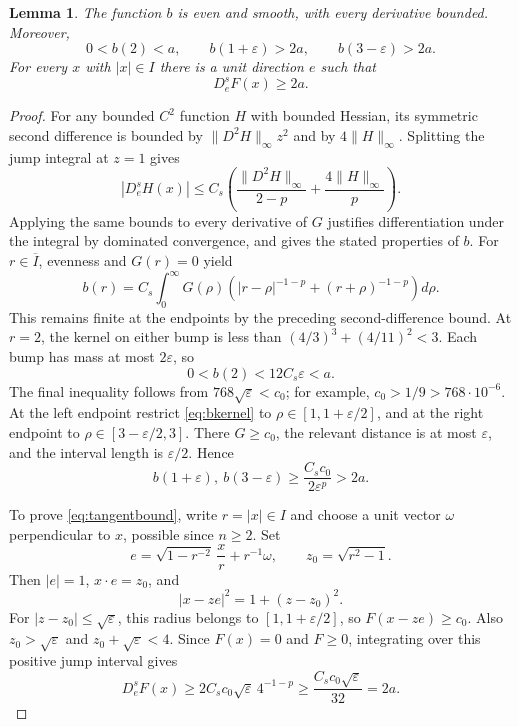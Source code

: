 \documentclass[11pt]{article}
\newtheorem{lemma}{Lemma}
\newcommand{\norm}[1]{\lVert#1\rVert_\infty}
\begin{document}
\begin{lemma}\label{lem:annuli}
The function $b$ is even and smooth, with every derivative bounded. Moreover,
\begin{equation}\label{eq:radialbounds}
 0<b(2)<a,\qquad b(1+\varepsilon)>2a,\qquad b(3-\varepsilon)>2a.
\end{equation}
For every $x$ with $|x|\in I$ there is a unit direction $e$ such that
\begin{equation}\label{eq:tangentbound}
 D_e^sF(x)\ge2a.
\end{equation}
\end{lemma}
\begin{proof}
For any bounded $C^2$ function $H$ with bounded Hessian, its symmetric
second difference is bounded by $\norm{D^2H}z^2$ and by $4\norm H$.
Splitting the jump integral at $z=1$ gives
\begin{equation}\label{eq:universalbound}
 |D_e^sH(x)|\le C_s\left(\frac{\norm{D^2H}}{2-p}
                         +\frac{4\norm H}{p}\right).
\end{equation}
Applying the same bounds to every derivative of $G$ justifies differentiation
under the integral by dominated convergence, and gives the stated properties
of $b$. For $r\in\overline I$, evenness and $G(r)=0$ yield
\begin{equation}\label{eq:bkernel}
 b(r)=C_s\int_0^\infty G(\rho)
 \left(|r-\rho|^{-1-p}+(r+\rho)^{-1-p}\right)d\rho.
\end{equation}
This remains finite at the endpoints by the preceding second-difference
bound. At $r=2$, the kernel on either bump is less than
$(4/3)^3+(4/11)^2<3$. Each bump has mass at most $2\varepsilon$, so
\[
 0<b(2)<12C_s\varepsilon<a.
\]
The final inequality follows from $768\sqrt\varepsilon<c_0$; for example,
$c_0>1/9>768\cdot10^{-6}$.
At the left endpoint restrict \eqref{eq:bkernel} to
$\rho\in[1,1+\varepsilon/2]$, and at the right endpoint to
$\rho\in[3-\varepsilon/2,3]$. There $G\ge c_0$, the relevant distance is
at most $\varepsilon$, and the interval length is $\varepsilon/2$. Hence
\[
 b(1+\varepsilon),\ b(3-\varepsilon)
 \ge \frac{C_s c_0}{2\varepsilon^p}>2a.
\]

To prove \eqref{eq:tangentbound}, write $r=|x|\in I$ and choose a unit
vector $\omega$ perpendicular to $x$, possible since $n\ge2$. Set
\[
 e=\sqrt{1-r^{-2}}\,\frac{x}{r}+r^{-1}\omega,
 \qquad z_0=\sqrt{r^2-1}.
\]
Then $|e|=1$, $x\cdot e=z_0$, and
\[
 |x-ze|^2=1+(z-z_0)^2.
\]
For $|z-z_0|\le\sqrt\varepsilon$, this radius belongs to
$[1,1+\varepsilon/2]$, so $F(x-ze)\ge c_0$. Also
$z_0>\sqrt\varepsilon$ and $z_0+\sqrt\varepsilon<4$.
Since $F(x)=0$ and $F\ge0$, integrating over this positive jump interval gives
\[
 D_e^sF(x)\ge 2C_s c_0\sqrt\varepsilon\,4^{-1-p}
 \ge\frac{C_s c_0\sqrt\varepsilon}{32}=2a.
\]
\end{proof}
\end{document}
